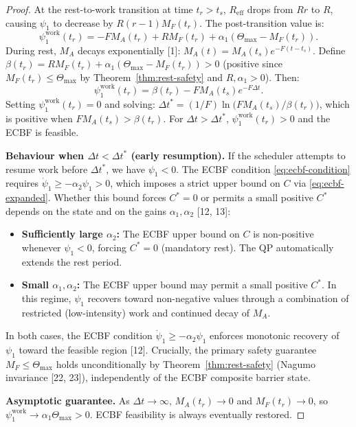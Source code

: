 \documentclass[11pt,a4paper]{article}
\begin{document}
\begin{proof}
At the rest-to-work transition at time $t_r > t_s$, $R_{\mathrm{eff}}$
drops from $Rr$ to $R$, causing $\psi_1$ to decrease by
$R(r-1)M_F(t_r)$. The post-transition value is:
\[
\psi_1^{\mathrm{work}}(t_r) = -F M_A(t_r) + R M_F(t_r) + \alpha_1(\Theta_{\max} - M_F(t_r)).
\]
During rest, $M_A$ decays exponentially [1]: $M_A(t) =
M_A(t_s) e^{-F(t - t_s)}$. Define $\beta(t_r) = R M_F(t_r) +
\alpha_1(\Theta_{\max} - M_F(t_r)) > 0$ (positive since $M_F(t_r) \leq
\Theta_{\max}$ by Theorem~\ref{thm:rest-safety} and $R, \alpha_1 > 0$).
Then:
\[
\psi_1^{\mathrm{work}}(t_r) = \beta(t_r) - F M_A(t_s) e^{-F \Delta t}.
\]
Setting $\psi_1^{\mathrm{work}}(t_r) = 0$ and solving:
$\Delta t^* = (1/F) \ln\bigl(F M_A(t_s)/\beta(t_r)\bigr)$,
which is positive when $F M_A(t_s) > \beta(t_r)$.
For $\Delta t > \Delta t^*$, $\psi_1^{\mathrm{work}}(t_r) > 0$ and the ECBF is feasible.

\textbf{Behaviour when $\Delta t < \Delta t^*$ (early resumption).}
If the scheduler attempts to resume work before $\Delta t^*$, we have
$\psi_1 < 0$. The ECBF condition \eqref{eq:ecbf-condition} requires
$\dot\psi_1 \geq -\alpha_2 \psi_1 > 0$, which imposes a strict upper
bound on $C$ via \eqref{eq:ecbf-expanded}. Whether this bound forces
$C^* = 0$ or permits a small positive $C^*$ depends on the state and
on the gains $\alpha_1, \alpha_2$ [12, 13]:
\begin{itemize}[noitemsep]
\item \textbf{Sufficiently large $\alpha_2$:} The ECBF upper bound on $C$ is non-positive whenever $\psi_1 < 0$, forcing $C^* = 0$ (mandatory rest). The QP automatically extends the rest period.
\item \textbf{Small $\alpha_1, \alpha_2$:} The ECBF upper bound may permit a small positive $C^*$. In this regime, $\psi_1$ recovers toward non-negative values through a combination of restricted (low-intensity) work and continued decay of $M_A$.
\end{itemize}
In both cases, the ECBF condition $\dot\psi_1 \geq -\alpha_2 \psi_1$
enforces monotonic recovery of $\psi_1$ toward the feasible region
[12]. Crucially, the primary safety guarantee $M_F \leq \Theta_{\max}$
holds unconditionally by Theorem~\ref{thm:rest-safety} (Nagumo
invariance [22, 23]), independently of the ECBF composite barrier
state.

\textbf{Asymptotic guarantee.} As $\Delta t \to \infty$, $M_A(t_r) \to
0$ and $M_F(t_r) \to 0$, so $\psi_1^{\mathrm{work}} \to \alpha_1
\Theta_{\max} > 0$. ECBF feasibility is always eventually restored.
\end{proof}
\end{document}
